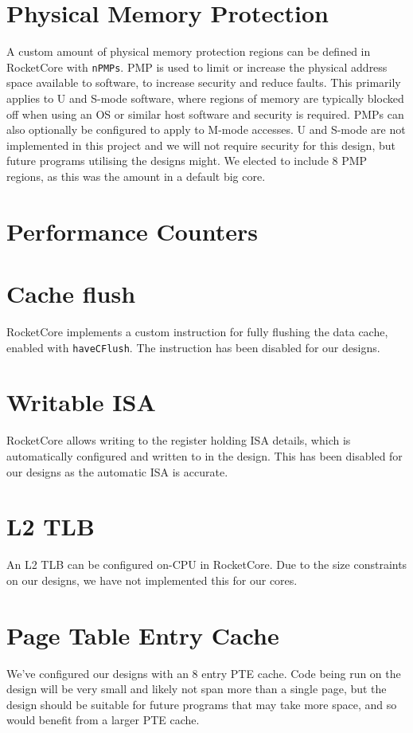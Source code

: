 \section{Physical Memory Protection}
A custom amount of physical memory protection regions can be defined in RocketCore with \texttt{nPMPs}. PMP is used to limit or increase the physical address space available to software, to increase security and reduce faults. This primarily applies to U and S-mode software, where regions of memory are typically blocked off when using an OS or similar host software and security is required. PMPs can also optionally be configured to apply to M-mode accesses. U and S-mode are not implemented in this project and we will not require security for this design, but future programs utilising the designs might. We elected to include 8 PMP regions, as this was the amount in a default big core.

\section{Performance Counters} %

\section{Cache flush}
RocketCore implements a custom instruction for fully flushing the data cache, enabled with \texttt{haveCFlush}. The instruction has been disabled for our designs.

\section{Writable ISA}
RocketCore allows writing to the register holding ISA details, which is automatically configured and written to in the design. This has been disabled for our designs as the automatic ISA is accurate.

\section{L2 TLB}
An L2 TLB can be configured on-CPU in RocketCore. Due to the size constraints on our designs, we have not implemented this for our cores.

\section{Page Table Entry Cache}
We've configured our designs with an 8 entry PTE cache. Code being run on the design will be very small and likely not span more than a single page, but the design should be suitable for future programs that may take more space, and so would benefit from a larger PTE cache.

